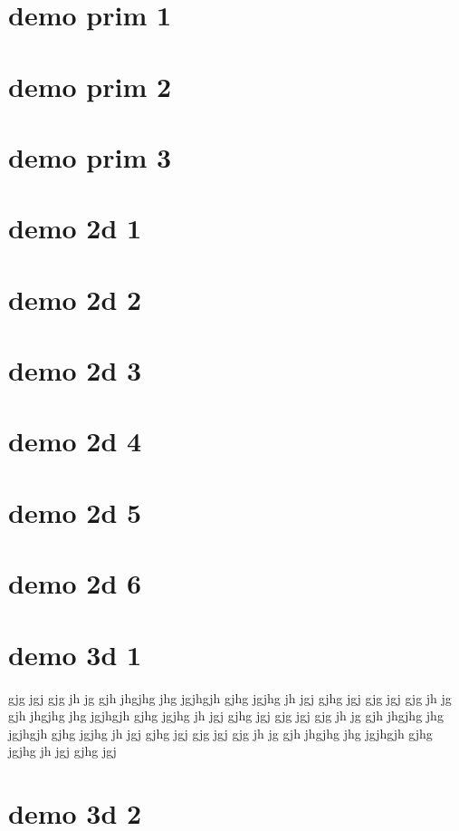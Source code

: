 \section{demo prim 1}
\section{demo prim 2}
\section{demo prim 3}
\section{demo 2d 1}
\section{demo 2d 2}
\section{demo 2d 3}
\section{demo 2d 4}
\section{demo 2d 5}
\section{demo 2d 6}
\section{demo 3d 1}
gjg jgj gjg jh jg gjh jhgjhg jhg jgjhgjh gjhg jgjhg jh jgj gjhg jgj  
gjg jgj gjg jh jg gjh jhgjhg jhg jgjhgjh gjhg jgjhg jh jgj gjhg jgj  
gjg jgj gjg jh jg gjh jhgjhg jhg jgjhgjh gjhg jgjhg jh jgj gjhg jgj 
gjg jgj gjg jh jg gjh jhgjhg jhg jgjhgjh gjhg jgjhg jh jgj gjhg jgj  
\section{demo 3d 2}

